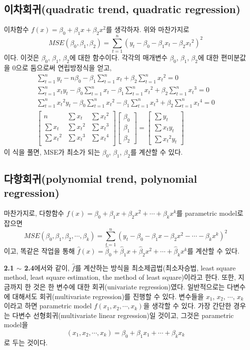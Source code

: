 \documentclass{article}
\begin{document}
\subsection{이차회귀(quadratic trend, quadratic regression)}
이차함수 \(f(x)=\beta_0+\beta_1x+\beta_2x^2\)를 생각하자.
위와 마찬가지로
\[MSE(\beta_0,\beta_1,\beta_2)=\sum_{t=1}^n(y_t-\beta_0-\beta_1{x_t}-\beta_2{x_t}^2)^2\]
이다.
이것은 \(\beta_0\), \(\beta_1\), \(\beta_2\)에 대한 함수이다.
각각의 매개변수 \(\beta_0\), \(\beta_1\), \(\beta_2\)에 대한 편미분값을 0으로 둠으로써 연립방정식을 얻고,
\begin{gather*}
\sum_{t=1}^ny_t-n\beta_0-\beta_1\sum_{t=1}^nx_t+\beta_2\sum_{t=1}^n{x_t}^2=0\\
\sum_{t=1}^nx_ty_t-\beta_0\sum_{t=1}^nx_t-\beta_1\sum_{t=1}^n{x_t}^2+\beta_2\sum_{t=1}^n{x_t}^3=0\\
\sum_{t=1}^n{x_t}^2y_t-\beta_0\sum_{t=1}^n{x_t}^2-\beta_1\sum_{t=1}^n{x_t}^3+\beta_2\sum_{t=1}^n{x_t}^4=0\\
\begin{bmatrix}
n&\sum x_t&\sum{x_t}^2\\
\sum x_t&\sum{x_t}^2&\sum{x_t}^3\\
\sum{x_t}^2&\sum{x_t}^3&\sum{x_t}^4\\
\end{bmatrix}
\begin{bmatrix}
\beta_0\\\beta_1\\\beta_2
\end{bmatrix}
=
\begin{bmatrix}
\sum y_t\\\sum x_ty_t\\\sum{x_t}^2y_t
\end{bmatrix}
\end{gather*}
이 식을 풀면, MSE가 최소가 되는 \(\beta_0\), \(\beta_1\), \(\beta_2\)를 계산할 수 있다.

\subsection{다항회귀(polynomial trend, polynomial regression)}
마찬가지로, 다항함수 \(f(x)=\beta_0+\beta_1x+\beta_2x^2+\cdots+\beta_kx^k\)를 parametric model로 잡으면
\[MSE(\beta_0,\beta_1,\beta_2,\cdots,\beta_k)=\sum_{t=1}^n(y_t-\beta_0-\beta_1x-\beta_2x^2-\cdots-\beta_kx^k)^2\]
이고, 똑같은 작업을 통해 \(\hat f(x)=\hat \beta_0+\hat \beta_1x+\hat \beta_2x^2+\cdots+\hat \beta_kx^k\)를 계산할 수 있다.

\textbf{2.1 \(\sim\) 2.4}에서와 같이, \(\hat f\)를 계산하는 방식을 최소제곱법(최소자승법, least square method, least square estimation, the method of least square)이라고 한다.
또한, 지금까지 한 것은 한 변수에 대한 회귀(univariate regression)였다.
일반적으로는 다변수에 대해서도 회귀(multivariate regression)를 진행할 수 있다.
변수들을 \(x_1\), \(x_2\), \(\cdots\), \(x_k\)이라고 하면 parametric model \(f(x_1,x_2,\cdots,x_k)\)을 생각할 수 있다.
가장 간단한 경우는 다변수 선형회귀(multivariate linear regression)일 것이고, 그것은 parametric model을
\[(x_1,x_2,\cdots,x_k)=\beta_0+\beta_1x_1+\cdots+\beta_kx_k\]
로 두는 것이다.
\end{document}
